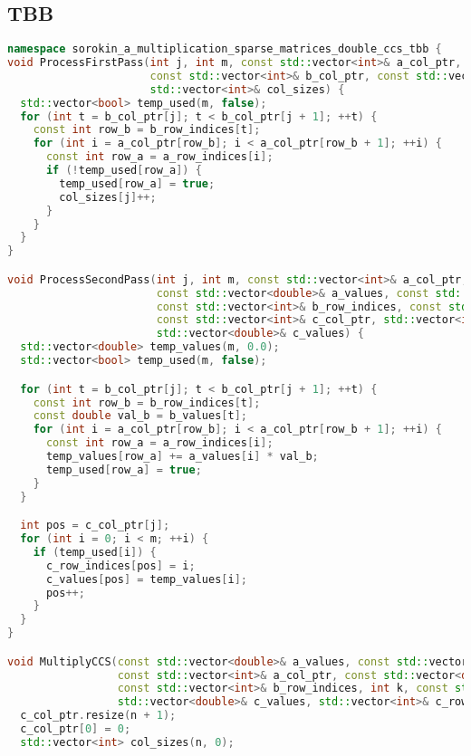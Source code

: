 \documentclass[12pt]{article}
\begin{document}
\subsection*{TBB}
\begin{lstlisting}[language=C++]
namespace sorokin_a_multiplication_sparse_matrices_double_ccs_tbb {
void ProcessFirstPass(int j, int m, const std::vector<int>& a_col_ptr, const std::vector<int>& a_row_indices,
                      const std::vector<int>& b_col_ptr, const std::vector<int>& b_row_indices,
                      std::vector<int>& col_sizes) {
  std::vector<bool> temp_used(m, false);
  for (int t = b_col_ptr[j]; t < b_col_ptr[j + 1]; ++t) {
    const int row_b = b_row_indices[t];
    for (int i = a_col_ptr[row_b]; i < a_col_ptr[row_b + 1]; ++i) {
      const int row_a = a_row_indices[i];
      if (!temp_used[row_a]) {
        temp_used[row_a] = true;
        col_sizes[j]++;
      }
    }
  }
}

void ProcessSecondPass(int j, int m, const std::vector<int>& a_col_ptr, const std::vector<int>& a_row_indices,
                       const std::vector<double>& a_values, const std::vector<int>& b_col_ptr,
                       const std::vector<int>& b_row_indices, const std::vector<double>& b_values,
                       const std::vector<int>& c_col_ptr, std::vector<int>& c_row_indices,
                       std::vector<double>& c_values) {
  std::vector<double> temp_values(m, 0.0);
  std::vector<bool> temp_used(m, false);

  for (int t = b_col_ptr[j]; t < b_col_ptr[j + 1]; ++t) {
    const int row_b = b_row_indices[t];
    const double val_b = b_values[t];
    for (int i = a_col_ptr[row_b]; i < a_col_ptr[row_b + 1]; ++i) {
      const int row_a = a_row_indices[i];
      temp_values[row_a] += a_values[i] * val_b;
      temp_used[row_a] = true;
    }
  }

  int pos = c_col_ptr[j];
  for (int i = 0; i < m; ++i) {
    if (temp_used[i]) {
      c_row_indices[pos] = i;
      c_values[pos] = temp_values[i];
      pos++;
    }
  }
}

void MultiplyCCS(const std::vector<double>& a_values, const std::vector<int>& a_row_indices, int m,
                 const std::vector<int>& a_col_ptr, const std::vector<double>& b_values,
                 const std::vector<int>& b_row_indices, int k, const std::vector<int>& b_col_ptr,
                 std::vector<double>& c_values, std::vector<int>& c_row_indices, int n, std::vector<int>& c_col_ptr) {
  c_col_ptr.resize(n + 1);
  c_col_ptr[0] = 0;
  std::vector<int> col_sizes(n, 0);


\end{lstlisting}
\end{document}
